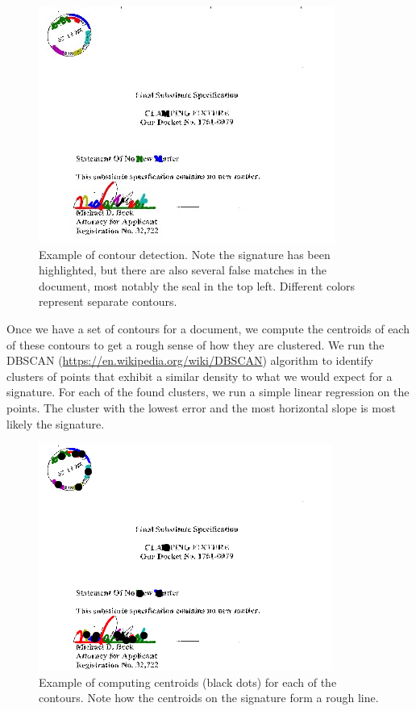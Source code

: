\documentclass[12pt]{article}
\begin{document}
\begin{figure}
\center
\includegraphics{figs/contour-detection}
\caption{Example of contour detection. Note the signature has been highlighted, but there are also several false matches in the document, most notably the seal in the top left. Different colors represent separate contours.}
\end{figure}

Once we have a set of contours for a document, we compute the centroids of each of these contours to get a rough sense of how they are clustered. We run the DBSCAN (\url{https://en.wikipedia.org/wiki/DBSCAN}) algorithm to identify clusters of points that exhibit a similar density to what we would expect for a signature. For each of the found clusters, we run a simple linear regression on the points. The cluster with the lowest error and the most horizontal slope is most likely the signature.

\begin{figure}
\center
\includegraphics{figs/contour-centroid}
\caption{Example of computing centroids (black dots) for each of the contours. Note how the centroids on the signature form a rough line.} 
\end{figure}
\end{document}
